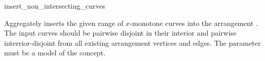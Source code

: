 \ccRefPageBegin

\begin{ccRefFunction}{insert_non_intersecting_curves}

\ccDefinition

Aggregately inserts the given range of $x$-monotone curves
\ccc{[first,last)} into the arrangement . The input curves should
be pairwise disjoint in their interior and pairwise interrior-disjoint
from all existing arrangement vertices and edges. 
The  parameter must be a model of the
 concept.



\end{ccRefFunction}

\ccRefPageEnd
